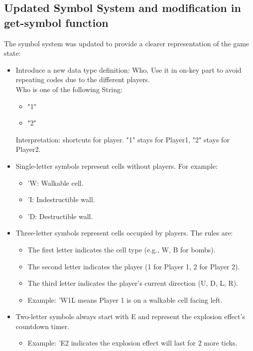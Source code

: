 \documentclass[12pt]{article}
\begin{document}
\subsection*{Updated Symbol System and modification in get-symbol function}
\hspace*{1.27cm}The symbol system was updated to provide a clearer representation of the game state:  
\begin{itemize}
  \item Introduce a new data type definition: Who. Use it in on-key part to avoid repeating codes due to the different players. \\
  Who is one of the following String: 
   \begin{itemize}
      \item "1"
      \item "2"
    \end{itemize}
 Interpretation: shortcuts for player. "1" stays for Player1, "2" stays for Player2.
  \item Single-letter symbols represent cells without players. For example:
    \begin{itemize}
      \item 'W: Walkable cell.
      \item 'I: Indestructible wall.
      \item 'D: Destructible wall.
    \end{itemize}
  \item Three-letter symbols represent cells occupied by players. The rules are:
    \begin{itemize}
      \item The first letter indicates the cell type (e.g., W, B for bombs).
      \item The second letter indicates the player (1 for Player 1, 2 for Player 2).
      \item The third letter indicates the player's current direction (U, D, L, R).
      \item Example: 'W1L means Player 1 is on a walkable cell facing left.
    \end{itemize}
  \item Two-letter symbols always start with E and represent the explosion effect's countdown timer.
    \begin{itemize}
      \item Example: 'E2 indicates the explosion effect will last for 2 more ticks.
    \end{itemize}
\end{itemize}
\end{document}
